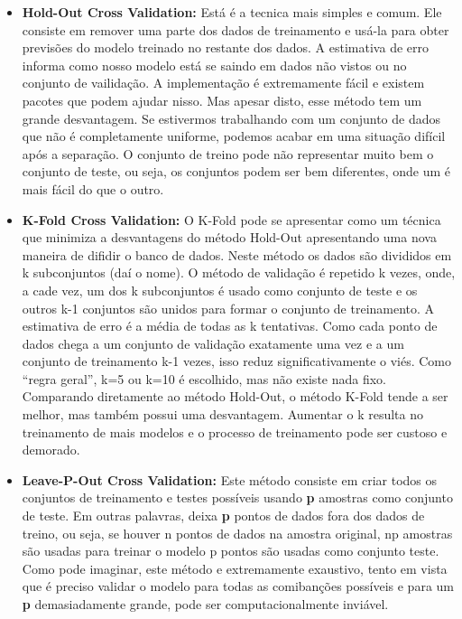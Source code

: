 \documentclass[
  letterpaper,
  DIV=11,
  numbers=noendperiod]{scrreprt}
\begin{document}
\begin{itemize}
\item
  \textbf{Hold-Out Cross Validation:} Está é a tecnica mais simples e
  comum. Ele consiste em remover uma parte dos dados de treinamento e
  usá-la para obter previsões do modelo treinado no restante dos dados.
  A estimativa de erro informa como nosso modelo está se saindo em dados
  não vistos ou no conjunto de vailidação. A implementação é
  extremamente fácil e existem pacotes que podem ajudar nisso. Mas
  apesar disto, esse método tem um grande desvantagem. Se estivermos
  trabalhando com um conjunto de dados que não é completamente uniforme,
  podemos acabar em uma situação difícil após a separação. O conjunto de
  treino pode não representar muito bem o conjunto de teste, ou seja, os
  conjuntos podem ser bem diferentes, onde um é mais fácil do que o
  outro.
\item
  \textbf{K-Fold Cross Validation:} O K-Fold pode se apresentar como um
  técnica que minimiza a desvantagens do método Hold-Out apresentando
  uma nova maneira de difidir o banco de dados. Neste método os dados
  são divididos em k subconjuntos (daí o nome). O método de validação é
  repetido k vezes, onde, a cade vez, um dos k subconjuntos é usado como
  conjunto de teste e os outros k-1 conjuntos são unidos para formar o
  conjunto de treinamento. A estimativa de erro é a média de todas as k
  tentativas. Como cada ponto de dados chega a um conjunto de validação
  exatamente uma vez e a um conjunto de treinamento k-1 vezes, isso
  reduz significativamente o viés. Como ``regra geral'', k=5 ou k=10 é
  escolhido, mas não existe nada fixo. Comparando diretamente ao método
  Hold-Out, o método K-Fold tende a ser melhor, mas também possui uma
  desvantagem. Aumentar o k resulta no treinamento de mais modelos e o
  processo de treinamento pode ser custoso e demorado.
\item
  \textbf{Leave-P-Out Cross Validation:} Este método consiste em criar
  todos os conjuntos de treinamento e testes possíveis usando \textbf{p}
  amostras como conjunto de teste. Em outras palavras, deixa \textbf{p}
  pontos de dados fora dos dados de treino, ou seja, se houver n pontos
  de dados na amostra original, np amostras são usadas para treinar o
  modelo p pontos são usadas como conjunto teste. Como pode imaginar,
  este método e extremamente exaustivo, tento em vista que é preciso
  validar o modelo para todas as comibanções possíveis e para um
  \textbf{p} demasiadamente grande, pode ser computacionalmente
  inviável.
\end{itemize}
\end{document}
